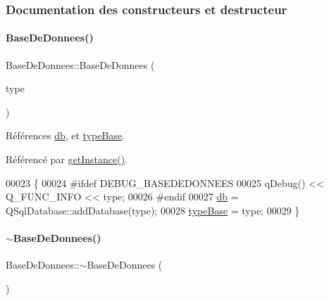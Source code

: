 \subsubsection{Documentation des constructeurs et destructeur}
\mbox{\label{class_base_de_donnees_a10dd177f1008f675ab78c2221b2a6750}} 
\paragraph{\texorpdfstring{Base\+De\+Donnees()}{BaseDeDonnees()}}
{\footnotesize\ttfamily Base\+De\+Donnees\+::\+Base\+De\+Donnees (\begin{DoxyParamCaption}\item[{Q\+String}]{type }\end{DoxyParamCaption})\hspace{0.3cm}{\ttfamily [private]}}



Références \hyperlink{class_base_de_donnees_a3e738dcf443370c46a541677ab619f06}{db}, et \hyperlink{class_base_de_donnees_ab682b82167f494496a6531bfe522b42b}{type\+Base}.



Référencé par \hyperlink{class_base_de_donnees_a80028aa2b6b4fbf30fb2e36357b7d3d3}{get\+Instance()}.


\begin{DoxyCode}
00023 \{
00024 \textcolor{preprocessor}{    #ifdef DEBUG\_BASEDEDONNEES}
00025     qDebug() << Q\_FUNC\_INFO << type;
00026 \textcolor{preprocessor}{    #endif}
00027     \hyperlink{class_base_de_donnees_a3e738dcf443370c46a541677ab619f06}{db} = QSqlDatabase::addDatabase(type);
00028     \hyperlink{class_base_de_donnees_ab682b82167f494496a6531bfe522b42b}{typeBase} = type;
00029 \}
\end{DoxyCode}
\mbox{\label{class_base_de_donnees_a5dc474cdbe003644fb0ca7b8f2ec6b93}} 
\paragraph{\texorpdfstring{$\sim$\+Base\+De\+Donnees()}{~BaseDeDonnees()}}
{\footnotesize\ttfamily Base\+De\+Donnees\+::$\sim$\+Base\+De\+Donnees (\begin{DoxyParamCaption}{ }\end{DoxyParamCaption})\hspace{0.3cm}{\ttfamily [private]}}


